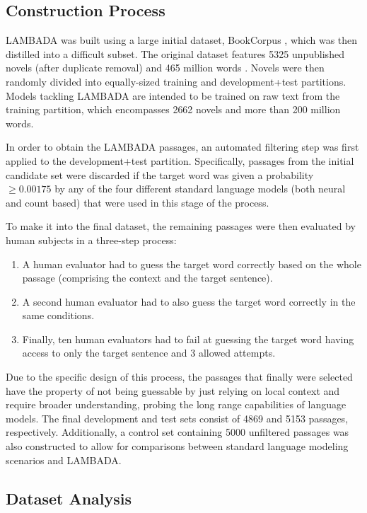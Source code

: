 \subsection{Construction Process}

LAMBADA was built using a large initial dataset, BookCorpus , which was then distilled into a difficult subset. The original dataset features 5325 unpublished novels (after duplicate removal) and 465 million words \cite{zhu2015aligning}. Novels were then randomly divided into equally-sized training and development+test partitions. Models tackling LAMBADA are intended to be trained on raw text from the training partition, which encompasses 2662 novels and more than 200 million words.

In order to obtain the LAMBADA passages, an automated filtering step was first applied to the development+test partition. Specifically, passages from the initial candidate set were discarded if the target word was given a probability $\geq 0.00175$ by any of the four different standard language models (both neural and count based) that were used in this stage of the process.

To make it into the final dataset, the remaining passages were then evaluated by human subjects in a three-step process:

\begin{enumerate}
	\item A human evaluator had to guess the target word correctly based on the whole passage (comprising the context and the target sentence).
	\item A second human evaluator had to also guess the target word correctly in the same conditions.
	\item Finally, ten human evaluators had to fail at guessing the target word having access to only the target sentence and 3 allowed attempts.
\end{enumerate}

Due to the specific design of this process, the passages that finally were selected have the property of not being guessable by just relying on local context and require broader understanding, probing the long range capabilities of language models. The final development and test sets consist of 4869 and 5153 passages, respectively. Additionally, a control set containing 5000 unfiltered passages was also constructed to allow for comparisons between standard language modeling scenarios and LAMBADA.

\subsection{Dataset Analysis}

